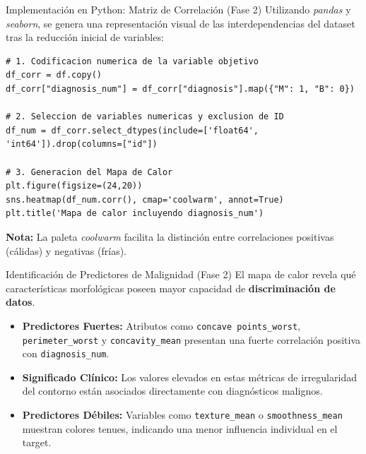 \documentclass{beamer}
\begin{document}
	\begin{frame}[fragile]{Implementación en Python: Matriz de Correlación (Fase 2)}
		Utilizando \textit{pandas} y \textit{seaborn}, se genera una representación visual de las interdependencias del dataset tras la reducción inicial de variables:
		
		\begin{lstlisting}[style=colab]
# 1. Codificacion numerica de la variable objetivo
df_corr = df.copy()
df_corr["diagnosis_num"] = df_corr["diagnosis"].map({"M": 1, "B": 0})

# 2. Seleccion de variables numericas y exclusion de ID
df_num = df_corr.select_dtypes(include=['float64', 'int64']).drop(columns=["id"])

# 3. Generacion del Mapa de Calor
plt.figure(figsize=(24,20))
sns.heatmap(df_num.corr(), cmap='coolwarm', annot=True)
plt.title('Mapa de calor incluyendo diagnosis_num')
		\end{lstlisting}
		\textbf{Nota:} La paleta \textit{coolwarm} facilita la distinción entre correlaciones positivas (cálidas) y negativas (frías).
	\end{frame}
	
	\begin{frame}{Identificación de Predictores de Malignidad (Fase 2)}
		El mapa de calor revela qué características morfológicas poseen mayor capacidad de \textbf{discriminación de datos}.
		
		\begin{itemize}
			\item<2-> \textbf{Predictores Fuertes:} Atributos como \texttt{concave points\_worst}, \texttt{perimeter\_worst} y \texttt{concavity\_mean} presentan una fuerte correlación positiva con \texttt{diagnosis\_num}.
			\item<3-> \textbf{Significado Clínico:} Los valores elevados en estas métricas de irregularidad del contorno están asociados directamente con diagnósticos malignos.
			\item<4-> \textbf{Predictores Débiles:} Variables como \texttt{texture\_mean} o \texttt{smoothness\_mean} muestran colores tenues, indicando una menor influencia individual en el target.
		\end{itemize}
	\end{frame}
	
\end{document}
